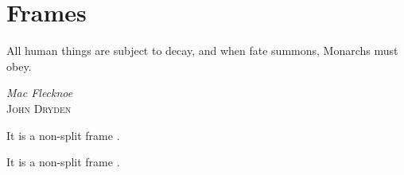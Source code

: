 \chapter{Frames}
\label{ch:ch2}

\epigraph{All human things are subject to decay, and when fate  summons, Monarchs must obey.}{\textit{Mac Flecknoe} \\ \textsc{John Dryden}}

\begin{notice}
	It is a non-split frame .
\end{notice}

\begin{notice}
	\lipsum[6-7]
\end{notice}

\lipsum[8-9]

\begin{highlight}[Problem 1]
	It is a non-split frame .
\end{highlight}

\lipsum[10-11]

\begin{highlight}[Problem 2]
	\lipsum[12-13]
\end{highlight}

\begin{highlight*}[No Problem]
	\lipsum[14-15]
\end{highlight*}